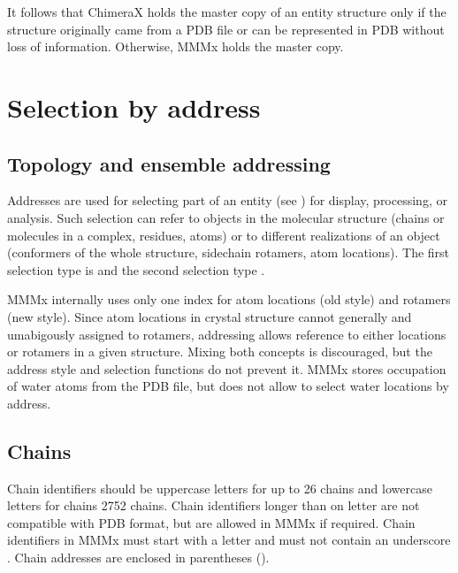 \documentclass[letterpaper,10pt,english]{sphinxmanual}
\begin{document}
It follows that ChimeraX holds the master copy of an entity structure only if the structure originally came from a PDB file or can be represented in PDB without loss of information.
Otherwise, MMMx holds the master copy.


\chapter{Selection by address}
\label{\detokenize{MMMx_addresses:selection-by-address}}\label{\detokenize{MMMx_addresses:mmmx-addresses}}\label{\detokenize{MMMx_addresses::doc}}

\section{Topology and ensemble addressing}
\label{\detokenize{MMMx_addresses:topology-and-ensemble-addressing}}
Addresses are used for selecting part of an entity (see {\hyperref[\detokenize{MMMx_atomic:mmmx-atomic}]{}}) for display, processing, or analysis.
Such selection can refer to objects in the molecular structure (chains or molecules in a complex, residues, atoms) or to different realizations of an object (conformers of the whole structure, sidechain rotamers, atom locations).
The first selection type is   and the second selection type .

MMMx internally uses only one index for atom locations (old style) and rotamers (new style).
Since atom locations in crystal structure cannot generally and umabigously assigned to rotamers, addressing allows reference to either locations or rotamers in a given structure.
Mixing both concepts is discouraged, but the address style and selection functions do not prevent it.
MMMx stores occupation of water atoms from the PDB file, but does not allow to select water locations by address.


\section{Chains}
\label{\detokenize{MMMx_addresses:chains}}
Chain identifiers should be upper\sphinxhyphen{}case letters for up to 26 chains and lower\sphinxhyphen{}case letters for chains 27\sphinxhyphen{}52 chains. Chain identifiers longer than on letter are not compatible with PDB format, but are allowed in MMMx if required.
Chain identifiers in MMMx must start with a letter and must not contain an underscore \sphinxcode{\sphinxupquote{\_}}. Chain addresses are enclosed in parentheses ().
\end{document}
